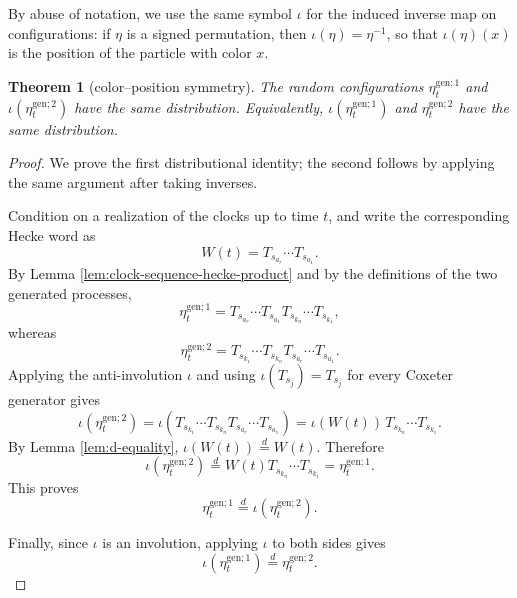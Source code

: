 \documentclass[12pt,a4paper]{amsart}
\newtheorem{theorem}{Theorem} %
\theoremstyle{remark}
\numberwithin{equation}{section} \numberwithin{theorem}{section}
\begin{document}
By abuse of notation, we use the same symbol $\iota$ for the induced inverse map on configurations: if $\eta$ is a signed permutation, then $\iota(\eta)=\eta^{-1}$, so that $\iota(\eta)(x)$ is the position of the particle with color $x$.

\begin{theorem}[color--position symmetry]
\label{thm:color-position}
The random configurations $\eta_t^{\mathrm{gen};1}$ and $\iota(\eta_t^{\mathrm{gen};2})$ have the same distribution. Equivalently, $\iota(\eta_t^{\mathrm{gen};1})$ and $\eta_t^{\mathrm{gen};2}$ have the same distribution.
\end{theorem}

\begin{proof}
We prove the first distributional identity; the second follows by applying the same argument after taking inverses.

Condition on a realization of the clocks up to time $t$, and write the corresponding Hecke word as
\[
W(t)=T_{s_{a_r}}\cdots T_{s_{a_1}}.
\]
By Lemma \ref{lem:clock-sequence-hecke-product} and by the definitions of the two generated processes,
\[
\eta_t^{\mathrm{gen};1}
=
T_{s_{a_r}}\cdots T_{s_{a_1}}
T_{s_{k_n}}\cdots T_{s_{k_1}},
\]
whereas
\[
\eta_t^{\mathrm{gen};2}
=
T_{s_{k_1}}\cdots T_{s_{k_n}}
T_{s_{a_r}}\cdots T_{s_{a_1}}.
\]
Applying the anti-involution $\iota$ and using $\iota(T_{s_j})=T_{s_j}$ for every Coxeter generator gives
\[
\iota(\eta_t^{\mathrm{gen};2})
=
\iota\!\left(
T_{s_{k_1}}\cdots T_{s_{k_n}}
T_{s_{a_r}}\cdots T_{s_{a_1}}
\right)
=
\iota(W(t))\,T_{s_{k_n}}\cdots T_{s_{k_1}}.
\]
By Lemma \ref{lem:d-equality}, $\iota(W(t))\overset{d}{=}W(t)$. 
Therefore
\[
\iota(\eta_t^{\mathrm{gen};2})
\overset{d}{=}
W(t)T_{s_{k_n}}\cdots T_{s_{k_1}}
=
\eta_t^{\mathrm{gen};1}.
\]
This proves
\[
\eta_t^{\mathrm{gen};1}\overset{d}{=}\iota(\eta_t^{\mathrm{gen};2}).
\]

Finally, since $\iota$ is an involution, applying $\iota$ to both sides gives
\[
\iota(\eta_t^{\mathrm{gen};1})
\overset{d}{=}
\eta_t^{\mathrm{gen};2}.
\]
\end{proof}
\end{document}
